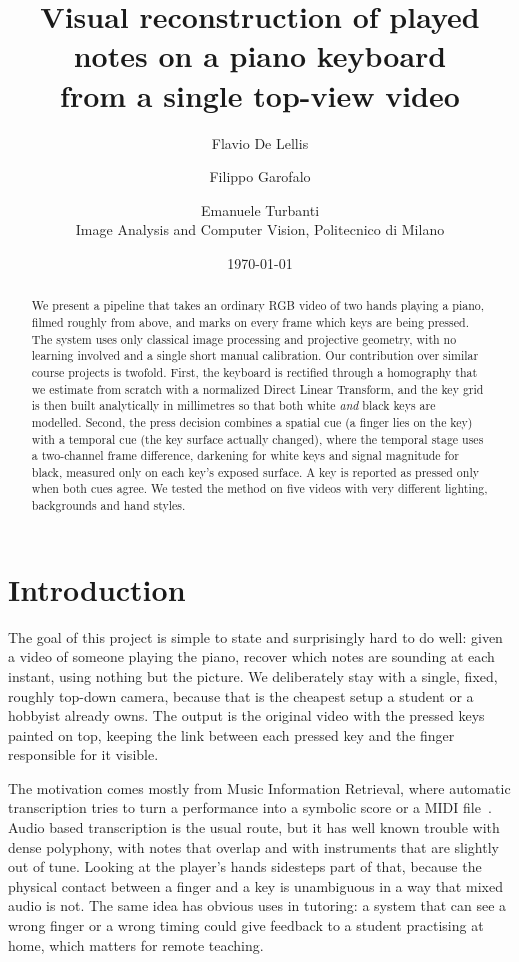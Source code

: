 \documentclass[11pt]{article}
\title{\textbf{Visual reconstruction of played notes on a piano keyboard\\
from a single top-view video}}
\author{
  Flavio De Lellis \and
  Filippo Garofalo \and
  Emanuele Turbanti \\[4pt]
  \small Image Analysis and Computer Vision, Politecnico di Milano
}
\date{\today} %
\begin{document}
\maketitle

\begin{abstract}
\noindent
We present a pipeline that takes an ordinary RGB video of two hands playing a
piano, filmed roughly from above, and marks on every frame which keys are being
pressed. The system uses only classical image processing and projective
geometry, with no learning involved and a single short manual calibration. Our
contribution over similar course projects is twofold. First, the keyboard is
rectified through a homography that we estimate from scratch with a normalized
Direct Linear Transform, and the key grid is then built analytically in
millimetres so that both white \emph{and} black keys are modelled. Second, the
press decision combines a spatial cue (a finger lies on the key) with a temporal
cue (the key surface actually changed), where the temporal stage uses a
two-channel frame difference, darkening for white keys and signal magnitude for
black, measured only on each key's exposed surface. A key
is reported as pressed only when both cues agree. We tested the method on five
videos with very different lighting, backgrounds and hand styles.
\end{abstract}

\section{Introduction}
The goal of this project is simple to state and surprisingly hard to do well:
given a video of someone playing the piano, recover which notes are sounding at
each instant, using nothing but the picture. We deliberately stay with a
single, fixed, roughly top-down camera, because that is the cheapest setup a
student or a hobbyist already owns. The output is the original video with the
pressed keys painted on top, keeping the link between each pressed key and the
finger responsible for it visible.

The motivation comes mostly from Music Information Retrieval, where automatic
transcription tries to turn a performance into a symbolic score or a MIDI
file~\cite{benetos2019transcription}. Audio based transcription is the usual
route, but it has well known trouble with dense polyphony, with notes that
overlap and with instruments that are slightly out of tune. Looking at the
player's hands sidesteps part of that, because the physical contact between a
finger and a key is unambiguous in a way that mixed audio is not. The same idea
has obvious uses in tutoring: a system that can see a wrong finger or a wrong
timing could give feedback to a student practising at home, which matters for
remote teaching.
\end{document}
